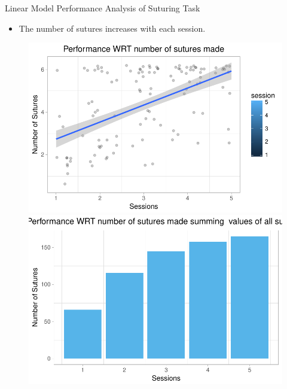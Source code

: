 \documentclass{beamer}
\begin{document}
\begin{frame}{Linear Model}{ Performance Analysis of Suturing Task}
\begin{itemize}
  \item {The number of sutures increases with each session.}
      \end{itemize}
\begin{figure}[!htb]
	\begin{minipage}[c]{0.45\linewidth}
	\includegraphics[width=\linewidth]{PerformanceWRTSutures.pdf}
	\end{minipage}
	\hfill
	\begin{minipage}[c]{0.45\linewidth}
	\includegraphics[width=\linewidth]{PerformanceWRTSutures_bar.pdf}
	\end{minipage}
\end{figure}
 \end{frame}
\end{document}
